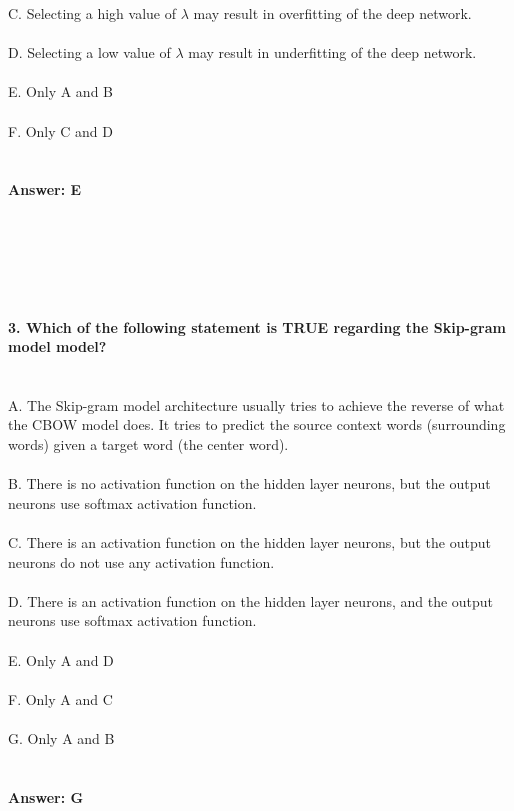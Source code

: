 \documentclass[prl,twocolumn,showpacs,preprintnumbers,superscriptaddress]{revtex4}
\theoremstyle{plain}
\theoremstyle{definition}
\begin{document}
\begin{widetext}
C. Selecting a high value of $\lambda$ may result in overfitting of the deep network.
\\
\\
D. Selecting a low value of $\lambda$ may result in underfitting of the deep network.
\\
\\
E. Only A and B
\\
\\
F. Only C and D
\\
\\
\\
\textbf{Answer: E}
\\
\\
\\
\\
\\
\\
\\
\textbf{3. Which of the following statement is TRUE regarding the Skip-gram model model?}
\\
\\
\\
A. The Skip-gram model architecture usually tries to achieve the reverse of what the CBOW model does. It tries to predict the source context words (surrounding words) given a target word (the center word).
\\
\\
B. There is no activation function on the hidden layer neurons, but the output neurons use softmax activation function.
\\
\\
C. There is an activation function on the hidden layer neurons, but the output neurons do not use any activation function.
\\
\\
D. There is an activation function on the hidden layer neurons, and the output neurons use softmax activation function.
\\
\\
E. Only A and D
\\
\\
F. Only A and C
\\
\\
G. Only A and B
\\
\\
\\
\textbf{Answer: G}

\end{widetext}
\end{document}
